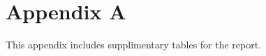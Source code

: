 \section{Appendix A}
\label{appenix:a}

This appendix includes supplimentary tables for the report.

